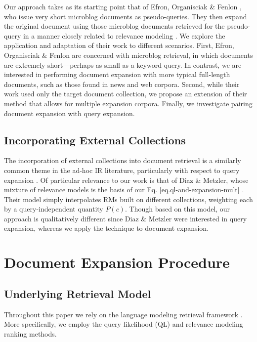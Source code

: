 \documentclass{sig-alternate}
\begin{document}
Our approach takes as its starting point that of Efron, Organisciak \& Fenlon \cite{Efron2012}, who issue very short microblog documents as pseudo-queries. They then expand the original document using those microblog documents retrieved for the pseudo-query in a manner closely related to relevance modeling \cite{Lavrenko2001}. We explore the application and adaptation of their work to different scenarios. First, Efron, Organisciak \& Fenlon are concerned with microblog retrieval, in which documents are extremely short---perhaps as small as a keyword query. In contrast, we are interested in performing document expansion with more typical full-length documents, such as those found in news and web corpora. Second, while their work used only the target document collection, we propose an extension of their method that allows for multiple expansion corpora. Finally, we investigate pairing document expansion with query expansion.

\subsection{Incorporating External Collections}\label{section.external.collections}

The incorporation of external collections into document retrieval is a similarly common theme in the ad-hoc IR literature, particularly with respect to query expansion \cite{Diaz2006, Weerkamp2009, Li2007, Xu2009, Bendersky2012}. Of particular relevance to our work is that of Diaz \& Metzler, whose mixture of relevance models is the basis of our Eq. \ref{eq.ql-and-expansion-mult} \cite{Diaz2006}. Their model simply interpolates RMs built on different collections, weighting each by a query-independent quantity $P(c)$. Though based on this model, our approach is qualitatively different since Diaz \& Metzler were interested in query expansion, whereas we apply the technique to document expansion.

\section{Document Expansion Procedure}\label{section.expanding}

\subsection{Underlying Retrieval Model}\label{section.expanding.model}
Throughout this paper we rely on the language modeling retrieval framework \cite{Lafferty2001}. More specifically, we employ the query likelihood (QL) and relevance modeling ranking methods. 
\end{document}
